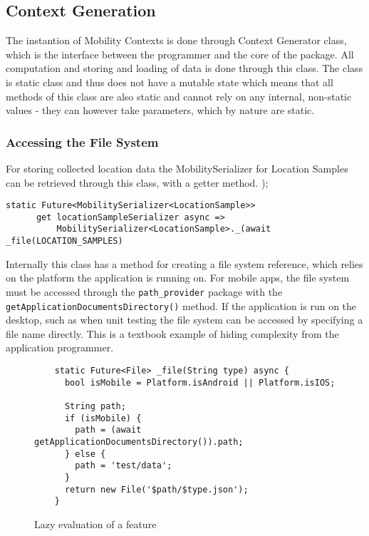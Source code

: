 \subsection{Context Generation}
The instantion of Mobility Contexts is done through Context Generator class, which is the interface between the programmer and the core of the package. All computation and storing and loading of data is done through this class. The class is static class and thus does not have a mutable state which means that all methods of this class are also static and cannot rely on any internal, non-static values - they can however take parameters, which by nature are static. 

\subsubsection{Accessing the File System}
For storing collected location data the MobilitySerializer for Location Samples can be retrieved through this class, with a getter method. 
);
\begin{verbatim}
static Future<MobilitySerializer<LocationSample>>
      get locationSampleSerializer async =>
          MobilitySerializer<LocationSample>._(await _file(LOCATION_SAMPLES)
\end{verbatim}

Internally this class has a method for creating a file system reference, which relies on the platform the application is running on. For mobile apps, the file system must be accessed through the \verb|path_provider| package with the \verb|getApplicationDocumentsDirectory()| method. If the application is run on the desktop, such as when unit testing the file system can be accessed by specifying a file name directly. This is a textbook example of hiding complexity from the application programmer.

\begin{figure}
    \centering
    \begin{verbatim}
    static Future<File> _file(String type) async {
      bool isMobile = Platform.isAndroid || Platform.isIOS;
    
      String path;
      if (isMobile) {
        path = (await getApplicationDocumentsDirectory()).path;
      } else {
        path = 'test/data';
      }
      return new File('$path/$type.json');
    }
    \end{verbatim}
    \caption{Lazy evaluation of a feature}
    \label{fig:lazy-evaluation}
\end{figure}

